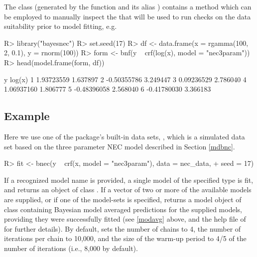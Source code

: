 \documentclass[
  shortnames]{jss}
\begin{document}
The class  (generated by the function  and its alias ) contains a  method which can be employed to manually inspect the  that will be used to run checks on the data suitability prior to model fitting, e.g.

\begin{CodeChunk}
\begin{CodeInput}
R> library("bayesnec")
R> set.seed(17)
R> df <- data.frame(x = rgamma(100, 2, 0.1), y = rnorm(100))
R> form <- bnf(y ~ crf(log(x), model = "nec3param"))
R> head(model.frame(form, df))
\end{CodeInput}
\begin{CodeOutput}
            y   log(x)
1  1.93723559 1.637897
2 -0.50355786 3.249447
3  0.09236529 2.786040
4  1.06937160 1.806777
5 -0.48396058 2.568040
6 -0.41780030 3.366183
\end{CodeOutput}
\end{CodeChunk}

\subsection[Example]{Example}\label{example}

Here we use one of the package's built-in data sets, , which is a simulated data set based on the three parameter NEC model  described in Section \ref{mdbnc}.

\begin{CodeChunk}
\begin{CodeInput}
R> fit <- bnec(y ~ crf(x, model = "nec3param"), data = nec_data,
+             seed = 17)
\end{CodeInput}
\end{CodeChunk}

If a recognized model name is provided, a single model of the specified type is fit, and  returns an object of class . If a vector of two or more of the available models are supplied, or if one of the model-sets is specified,  returns a model object of class  containing Bayesian model averaged predictions for the supplied models, providing they were successfully fitted (see \ref{modavg} above, and the help file of  for further details). By default,  sets the number of chains to 4, the number of iterations per chain to 10,000, and the size of the warm-up period to 4/5 of the number of iterations (i.e., 8,000 by default).
\end{document}
